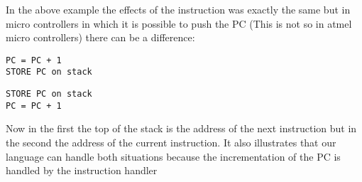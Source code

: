 In the above example the effects of the instruction was exactly the same
but in micro controllers in which it is possible to push the PC (This
is not so in atmel micro controllers) there can be a difference:

\lstset{caption=PC points to next instruction}
\begin{lstlisting}
PC = PC + 1
STORE PC on stack
\end{lstlisting}

\lstset{caption=PC points to current instruction}
\begin{lstlisting}
STORE PC on stack
PC = PC + 1
\end{lstlisting}

Now in the first the top of the stack is the address of the next
instruction but in the second the address of the current instruction.
It also illustrates that our language can handle both situations
because the incrementation of the PC is handled by the instruction
handler
